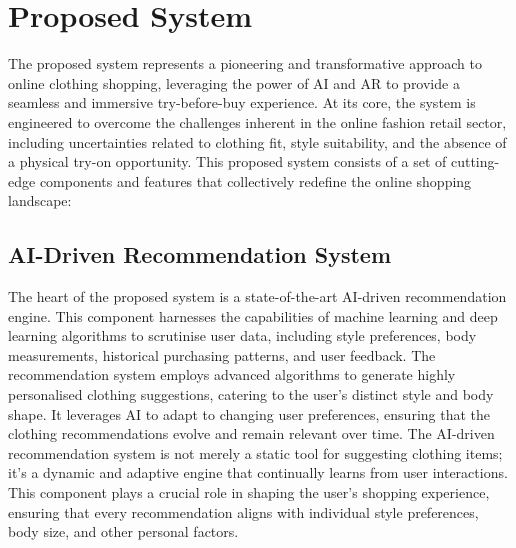 	\nocite{stocker2021new, DBLP:journals/csur/ChengSCHL21, Jain_Wah_2022, DBLP:journals/corr/abs-2202-02757, DBLP:journals/sncs/ShirkhaniMSH23, DBLP:journals/corr/abs-2111-00905, DBLP:journals/mta/GhodhbaniNRA22, DBLP:journals/cvm/LiangL21, menon2020impact, jayamini2021use, DBLP:journals/corr/abs-2202-09450, huang2019enhancing, mehta2020enhancement, zak2020augmented, caboni2019augmented, DBLP:journals/access/GiriJZB19, DBLP:journals/corr/abs-2105-03050, DBLP:journals/access/GuoZLCCW23, DBLP:journals/spm/ChenSC23, sahni2021review, liang2020implementation, sareen2022ai, 10153335, DBLP:journals/tmm/Yan0LZX0Y23}

\section{Proposed System}
	The proposed system represents a pioneering and transformative approach to online clothing shopping, leveraging the power of AI and AR to provide a seamless and immersive try-before-buy experience. At its core, the system is engineered to overcome the challenges inherent in the online fashion retail sector, including uncertainties related to clothing fit, style suitability, and the absence of a physical try-on opportunity. This proposed system consists of a set of cutting-edge components and features that collectively redefine the online shopping landscape:

	\subsection{AI-Driven Recommendation System}
		The heart of the proposed system is a state-of-the-art AI-driven recommendation engine. This component harnesses the capabilities of machine learning and deep learning algorithms to scrutinise user data, including style preferences, body measurements, historical purchasing patterns, and user feedback. The recommendation system employs advanced algorithms to generate highly personalised clothing suggestions, catering to the user's distinct style and body shape. It leverages AI to adapt to changing user preferences, ensuring that the clothing recommendations evolve and remain relevant over time. The AI-driven recommendation system is not merely a static tool for suggesting clothing items; it's a dynamic and adaptive engine that continually learns from user interactions. This component plays a crucial role in shaping the user's shopping experience, ensuring that every recommendation aligns with individual style preferences, body size, and other personal factors.


